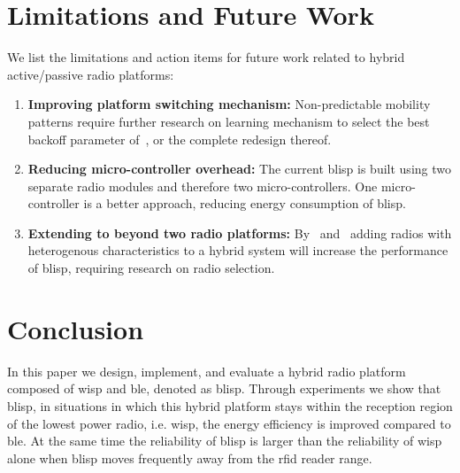 \documentclass[conference,letterpaper,twoside,final,10pt]{IEEEtran}
\newcommand{\acresetwithnoexpand}{\acresetall
	\acused{gsm}
	\acused{rfid}
	\acused{rf}
	\acused{rn16}
}
\begin{document}
\section{Limitations and Future Work}
\label{sec:future}

We list the limitations and action items for future work related to hybrid active/passive radio platforms:

\begin{enumerate}
	\item 	\textbf{Improving platform switching mechanism:} Non-predictable mobility patterns require further research on learning mechanism to select the best backoff parameter  of~, or the complete redesign thereof.
	\item 	\textbf{Reducing micro-controller overhead:} The current \ac{blisp} is built using two separate radio modules and therefore two micro-controllers.
One micro-controller is a better approach, reducing energy consumption of \ac{blisp}.
	\item 	\textbf{Extending to beyond two radio platforms:} 
By~ and~ adding radios with heterogenous characteristics to a hybrid system will increase the performance of \ac{blisp}, requiring research on radio selection.
\end{enumerate}

\acresetwithnoexpand

\section{Conclusion}
\label{sec:conclusions}

In this paper we design, implement, and evaluate a hybrid radio platform composed of \acf{wisp} and \acf{ble}, denoted as \acs{blisp}.
Through experiments we show that \acs{blisp}, in situations in which this hybrid platform stays within the reception region of the lowest power radio, i.e. \ac{wisp}, the energy efficiency is improved compared to \ac{ble}. At the same time the reliability of \acs{blisp} is larger than the reliability of \ac{wisp} alone when \acs{blisp} moves frequently away from the \ac{rfid} reader range.
\end{document}
